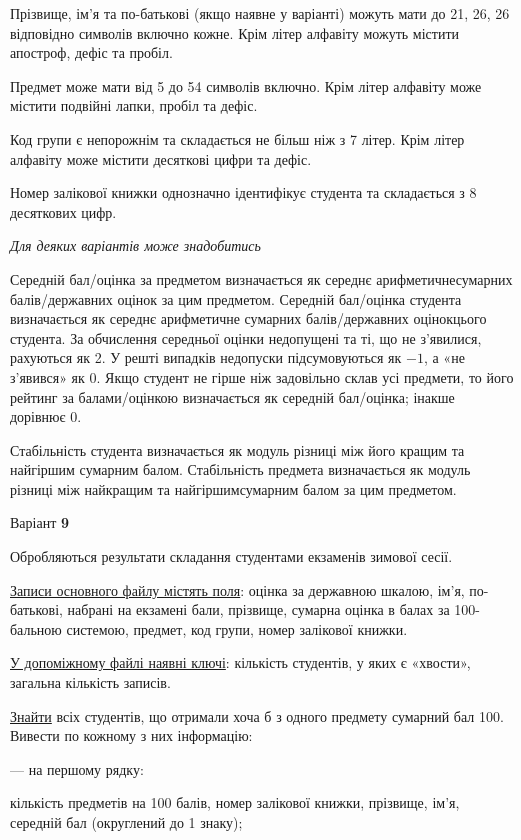 \documentclass[11pt, ukrainian]{article}
\begin{document}
Прізвище, ім’я та по-батькові (якщо наявне у варіанті) можуть мати до 21, 26, 26 відповідно символів включно кожне. 
Крім літер алфавіту можуть містити апостроф, дефіс та пробіл.

Предмет може мати від 5 до 54 символів включно. 
Крім літер алфавіту може містити подвійні лапки, пробіл та дефіс.

Код групи є непорожнім та складається не більш ніж з 7 літер. 
Крім літер алфавіту може містити десяткові цифри та дефіс.


Номер залікової книжки однозначно ідентифікує студента та складається з 8 десяткових цифр. 

\bigskip\textit{Для деяких варіантів може знадобитись}

Середній бал/оцінка за предметом визначається як середнє арифметичнесумарних балів/державних оцінок за цим предметом. 
Середній бал/оцінка студента визначається як середнє арифметичне сумарних балів/державних оцінокцього студента. 
За обчислення середньої оцінки недопущені та ті, що не з’явилися, рахуються як 2.
У решті випадків недопуски підсумовуються як $-1$, а «не з’явився» як 0.
Якщо студент не гірше ніж задовільно склав усі предмети, 
то його рейтинг за балами/оцінкою визначається як середній бал/оцінка; інакше дорівнює 0.

Стабільність студента визначається як модуль різниці між його кращим та найгіршим сумарним балом.
Стабільність предмета визначається як модуль різниці між найкращим та найгіршимсумарним балом за цим предметом.




\par
\newpage
{\center Варіант  \No \textbf { 9 }\par}
\bigskip
Обробляються результати складання студентами екзаменів зимової сесії.

\underline{Записи основного файлу містять поля}: оцінка за державною шкалою, ім’я, по-батькові, набрані на екзамені бали, прізвище, сумарна оцінка в балах за 100-бальною системою, предмет, код групи, номер залікової книжки.

\underline{У допоміжному файлі наявні ключі}: кількість студентів, у яких є «хвости», загальна кількість записів.

\underline{Знайти} всіх студентів, що отримали хоча б з одного предмету сумарний бал 100. Вивести по кожному з них інформацію:\par
{\noindent}--- на першому рядку:\par
кількість предметів на 100 балів, номер залікової книжки, прізвище, ім’я, середній бал (округлений до 1 знаку);
\end{document}
